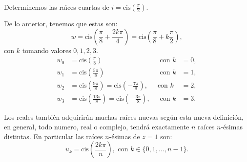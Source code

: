 \begin{ejemplo}{}{} 
    Determinemos las ra\'{\i}ces cuartas de 
    $i = \mbox{cis}\left(\frac \pi 2 \right)$.
    
    De lo anterior, tenemos que estas son:
    $$w = \mbox{cis}\left(\frac \pi 8 + \frac{2k \pi}{ 4} \right)= \mbox{cis}\left(\frac \pi 8 + k\frac \pi 2 \right),$$    
    con $k$ tomando valores $0, 1, 2, 3$.
    \begin{align*}
        w_0 &= \mbox{cis}\left(\frac \pi 8\right)\; &\mbox{ con } 
        k &= 0,\\
        w_1 &= \mbox{cis}\left(\frac{5 \pi}{8}\right)\; &\mbox{ con } 
        k &= 1,\\
        w_2 &= \mbox{cis}\left(\frac{9 \pi}{8}\right) =
            \mbox{cis}\left(-\frac{7 \pi}{8}\right),\; &\mbox{con } 
            k &= 2,\\
        w_3 &= \mbox{cis}\left(\frac{13 \pi}{8}\right) =
            \mbox{cis}\left(-\frac{3 \pi}{8}\right),\; &\mbox{ con  } 
            k &= 3.
    \end{align*}
    
\begin{center}
\end{center}

\end{ejemplo}

Los reales también adquirirán muchas raíces nuevas según esta nueva definición, en general, todo numero, real o complejo, tendrá exactamente $n$ raíces $n$-ésimas distintas.
En particular las raíces $n$-ésimas de $z=1$ son:
$$ u_k=\mbox{cis}\left(\frac{2k\pi}{n}\right),\textrm{ con }k\in\{0,1,\dots,n-1\}.$$


